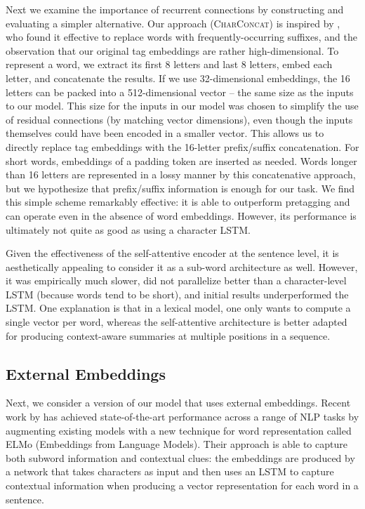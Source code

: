 \documentclass[11pt,a4paper]{article}
\begin{document}
Next we examine the importance of recurrent connections by constructing and evaluating a simpler alternative. Our approach (\textsc{CharConcat}) is inspired by \citet{hall_less_2014}, who found it effective to replace words with frequently-occurring suffixes, and the observation that our original tag embeddings are rather high-dimensional. To represent a word, we extract its first 8 letters and last 8 letters, embed each letter, and concatenate the results. If we use 32-dimensional embeddings, the 16 letters can be packed into a 512-dimensional vector -- the same size as the inputs to our model. This size for the inputs in our model was chosen to simplify the use of residual connections (by matching vector dimensions), even though the inputs themselves could have been encoded in a smaller vector. This allows us to directly replace tag embeddings with the 16-letter prefix/suffix concatenation. For short words, embeddings of a padding token are inserted as needed. Words longer than 16 letters are represented in a lossy manner by this concatenative approach, but we hypothesize that prefix/suffix information is enough for our task. We find this simple scheme remarkably effective: it is able to outperform pretagging and can operate even in the absence of word embeddings. However, its performance is ultimately not quite as good as using a character LSTM.

Given the effectiveness of the self-attentive encoder at the sentence level, it is aesthetically appealing to consider it as a sub-word architecture as well.  However, it was empirically much slower, did not parallelize better than a character-level LSTM (because words tend to be short), and initial results underperformed the LSTM. One explanation is that in a lexical model, one only wants to compute a single vector per word, whereas the self-attentive architecture is better adapted for producing context-aware summaries at multiple positions in a sequence.

\subsection{External Embeddings}
\label{subsec:elmo}

Next, we consider a version of our model that uses external embeddings. Recent work by \citet{peters_deep_2018} has achieved state-of-the-art performance across a range of NLP tasks by augmenting existing models with a new technique for word representation called ELMo (Embeddings from Language Models). Their approach is able to capture both subword information and contextual clues: the embeddings are produced by a network that takes characters as input and then uses an LSTM to capture contextual information when producing a vector representation for each word in a sentence.
\end{document}
